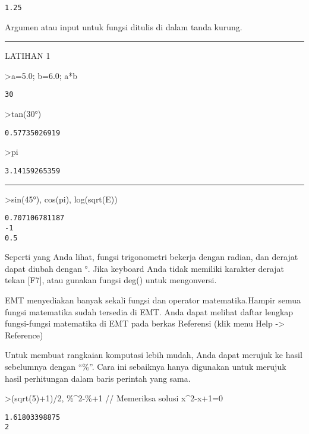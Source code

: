 \documentclass[
]{book}
\begin{document}
\begin{verbatim}
1.25
\end{verbatim}

Argumen atau input untuk fungsi ditulis di dalam tanda kurung.

\begin{center}\rule{0.5\linewidth}{0.5pt}\end{center}

LATIHAN 1

\textgreater a=5.0; b=6.0; a*b

\begin{verbatim}
30
\end{verbatim}

\textgreater tan(30°)

\begin{verbatim}
0.57735026919
\end{verbatim}

\textgreater pi

\begin{verbatim}
3.14159265359
\end{verbatim}

\begin{center}\rule{0.5\linewidth}{0.5pt}\end{center}

\textgreater sin(45°), cos(pi), log(sqrt(E))

\begin{verbatim}
0.707106781187
-1
0.5
\end{verbatim}

Seperti yang Anda lihat, fungsi trigonometri bekerja dengan radian, dan derajat dapat diubah dengan °. Jika keyboard Anda tidak memiliki karakter derajat tekan {[}F7{]}, atau gunakan fungsi deg() untuk mengonversi.

EMT menyediakan banyak sekali fungsi dan operator matematika.Hampir semua fungsi matematika sudah tersedia di EMT. Anda dapat melihat daftar lengkap fungsi-fungsi matematika di EMT pada berkas Referensi (klik menu Help -\textgreater{} Reference)

Untuk membuat rangkaian komputasi lebih mudah, Anda dapat merujuk ke hasil sebelumnya dengan ``\%''. Cara ini sebaiknya hanya digunakan untuk merujuk hasil perhitungan dalam baris perintah yang sama.

\textgreater(sqrt(5)+1)/2, \%\^{}2-\%+1 // Memeriksa solusi x\^{}2-x+1=0

\begin{verbatim}
1.61803398875
2
\end{verbatim}
\end{document}
